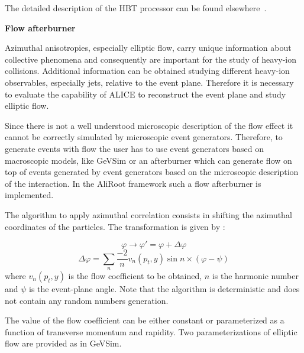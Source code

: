 \documentclass[12pt,a4paper,twoside]{article}
\begin{document}
The detailed description of the HBT processor can be found
elsewhere~\cite{MC:PiotrSk}.

\textbf{Flow afterburner}

Azimuthal anisotropies, especially elliptic flow, carry unique
information about collective phenomena and consequently are
important for the study of heavy-ion collisions.  Additional
information can be obtained studying different heavy-ion
observables, especially jets, relative to the event plane.
Therefore it is necessary to evaluate the capability of ALICE to
reconstruct the event plane and study elliptic flow.

Since there is not a well understood microscopic description of
the flow effect it cannot be correctly simulated by microscopic
event generators.  Therefore, to generate events with flow the user has
to use event generators based on macroscopic models, like GeVSim
\cite{MC:GEVSIM} or an afterburner which can generate flow on top
of events generated by event generators based on the microscopic
description of the interaction.  In the AliRoot framework such a
flow afterburner is implemented.

The algorithm to apply azimuthal correlation consists in shifting the
azimuthal coordinates of the particles.  The transformation is given
by \cite{MC:POSCANCER}:


\[
\varphi \rightarrow \varphi '=\varphi +\Delta \varphi \]
\[
\Delta \varphi =\sum _{n}\frac{-2}{n}v_{n}\left( p_{t},y\right)
\sin  n \times \left( \varphi -\psi \right) \] where \(
v_{n}(p_{t},y) \) is the flow coefficient to be obtained, \( n \)
is the harmonic number and \( \psi \) is the event-plane angle.
Note that the algorithm is deterministic and does not contain any
random numbers generation.

The value of the flow coefficient can be either constant or parameterized as a
function of transverse momentum and rapidity.  Two parameterizations
of elliptic flow are provided as in GeVSim.
\end{document}
